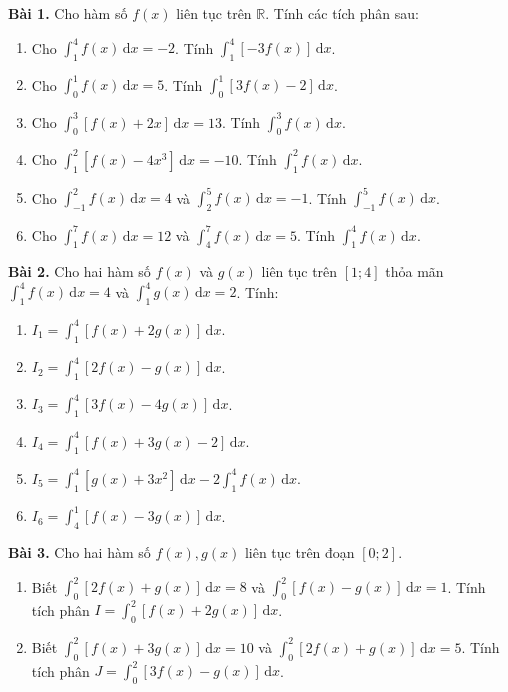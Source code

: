 \documentclass[12pt]{article}
\begin{document}
	\begin{btvang}
		\textbf{Bài 1.} Cho hàm số $f(x)$ liên tục trên $\mathbb{R}$. Tính các tích phân sau:
		\begin{enumerate}[label=\alph*)]
			\item Cho $\displaystyle \int_1^4 f(x)\,\mathrm{d}x = -2$. Tính $\displaystyle \int_1^4 [-3f(x)]\,\mathrm{d}x$.
			\item Cho $\displaystyle \int_0^1 f(x)\,\mathrm{d}x = 5$. Tính $\displaystyle \int_0^1 [3f(x) - 2]\,\mathrm{d}x$.
			\item Cho $\displaystyle \int_0^3 [f(x) + 2x]\,\mathrm{d}x = 13$. Tính $\displaystyle \int_0^3 f(x)\,\mathrm{d}x$.
			\item Cho $\displaystyle \int_1^2 [f(x) - 4x^3]\,\mathrm{d}x = -10$. Tính $\displaystyle \int_1^2 f(x)\,\mathrm{d}x$.
			\item Cho $\displaystyle \int_{-1}^2 f(x)\,\mathrm{d}x = 4$ và $\displaystyle \int_2^5 f(x)\,\mathrm{d}x = -1$. Tính $\displaystyle \int_{-1}^5 f(x)\,\mathrm{d}x$.
			\item Cho $\displaystyle \int_1^7 f(x)\,\mathrm{d}x = 12$ và $\displaystyle \int_4^7 f(x)\,\mathrm{d}x = 5$. Tính $\displaystyle \int_1^4 f(x)\,\mathrm{d}x$.
		\end{enumerate}
		
		\textbf{Bài 2.} Cho hai hàm số $f(x)$ và $g(x)$ liên tục trên $[1; 4]$ thỏa mãn $\displaystyle \int_1^4 f(x)\,\mathrm{d}x = 4$ và $\displaystyle \int_1^4 g(x)\,\mathrm{d}x = 2$. Tính:
		\begin{enumerate}[label=\alph*)]
			\item $I_1 = \displaystyle \int_1^4 [f(x) + 2g(x)]\,\mathrm{d}x$.
			\item $I_2 = \displaystyle \int_1^4 [2f(x) - g(x)]\,\mathrm{d}x$.
			\item $I_3 = \displaystyle \int_1^4 [3f(x) - 4g(x)]\,\mathrm{d}x$.
			\item $I_4 = \displaystyle \int_1^4 [f(x) + 3g(x) - 2]\,\mathrm{d}x$.
			\item $I_5 = \displaystyle \int_1^4 [g(x) + 3x^2]\,\mathrm{d}x - 2\int_1^4 f(x)\,\mathrm{d}x$.
			\item $I_6 = \displaystyle \int_4^1 [f(x) - 3g(x)]\,\mathrm{d}x$.
		\end{enumerate}
		
		\textbf{Bài 3.} Cho hai hàm số $f(x), g(x)$ liên tục trên đoạn $[0; 2]$.
		\begin{enumerate}[label=\alph*)]
			\item Biết $\displaystyle \int_0^2 [2f(x) + g(x)]\,\mathrm{d}x = 8$ và $\displaystyle \int_0^2 [f(x) - g(x)]\,\mathrm{d}x = 1$. Tính tích phân $I = \displaystyle \int_0^2 [f(x) + 2g(x)]\,\mathrm{d}x$.
			\item Biết $\displaystyle \int_0^2 [f(x) + 3g(x)]\,\mathrm{d}x = 10$ và $\displaystyle \int_0^2 [2f(x) + g(x)]\,\mathrm{d}x = 5$. Tính tích phân $J = \displaystyle \int_0^2 [3f(x) - g(x)]\,\mathrm{d}x$.
		\end{enumerate}
	\end{btvang}
	
\end{document}
